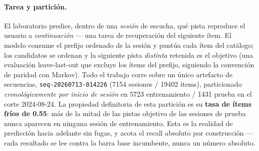 \documentclass[11pt]{article}
\newcommand{\dsid}[1]{\texttt{\small #1}}
\begin{document}
\paragraph{Tarea y partición.} El laboratorio predice, dentro de una
\emph{sesión} de escucha, qué pista reproduce el usuario a \emph{continuación}
--- una tarea de recuperación del siguiente ítem. El modelo consume el prefijo
ordenado de la sesión y puntúa cada ítem del catálogo; los candidatos se
ordenan y la siguiente pista \emph{distinta} retenida es el objetivo (una
evaluación leave-last-out que excluye los ítems del prefijo, siguiendo la
convención de paridad con Markov). Todo el trabajo corre sobre un único
artefacto de secuencias, \dsid{seq-20260713-014226} (\num{7154} sesiones /
\num{19402} ítems), particionado \emph{cronológicamente por inicio de sesión}
en \num{5723} entrenamiento / \num{1431} prueba en el corte 2024-08-24. La
propiedad definitoria de esta partición es su \textbf{tasa de ítems fríos de
\num{0.55}}: más de la mitad de las pistas objetivo de las sesiones de prueba
nunca aparecen en ninguna sesión de entrenamiento. Esta es la realidad de
predicción hacia adelante sin fugas, y acota el recall absoluto por
construcción --- cada resultado se lee contra la barra base incumbente, nunca
un número absoluto.
\end{document}
